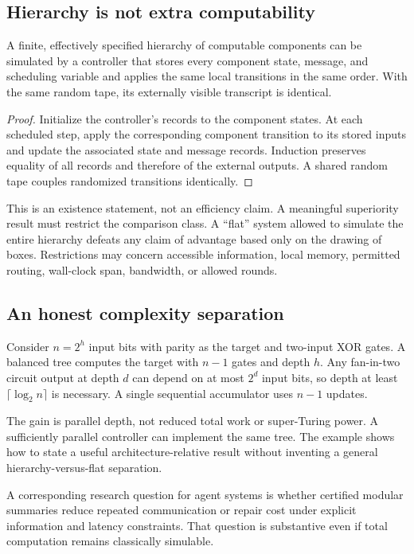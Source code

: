 \subsection{Hierarchy is not extra computability}
\begin{MSproposition}\label{MS:prop:flatten}
A finite, effectively specified hierarchy of computable components can be simulated by a controller that stores every component state, message, and scheduling variable and applies the same local transitions in the same order. With the same random tape, its externally visible transcript is identical.
\end{MSproposition}
\begin{proof}
Initialize the controller's records to the component states. At each scheduled step, apply the corresponding component transition to its stored inputs and update the associated state and message records. Induction preserves equality of all records and therefore of the external outputs. A shared random tape couples randomized transitions identically.
\end{proof}

This is an existence statement, not an efficiency claim. A meaningful superiority result must restrict the comparison class. A ``flat'' system allowed to simulate the entire hierarchy defeats any claim of advantage based only on the drawing of boxes. Restrictions may concern accessible information, local memory, permitted routing, wall-clock span, bandwidth, or allowed rounds.

\subsection{An honest complexity separation}
Consider $n=2^h$ input bits with parity as the target and two-input XOR gates. A balanced tree computes the target with $n-1$ gates and depth $h$. Any fan-in-two circuit output at depth $d$ can depend on at most $2^d$ input bits, so depth at least $\lceil\log_2n\rceil$ is necessary. A single sequential accumulator uses $n-1$ updates.

The gain is parallel depth, not reduced total work or super-Turing power. A sufficiently parallel controller can implement the same tree. The example shows how to state a useful architecture-relative result without inventing a general hierarchy-versus-flat separation.

A corresponding research question for agent systems is whether certified modular summaries reduce repeated communication or repair cost under explicit information and latency constraints. That question is substantive even if total computation remains classically simulable.

